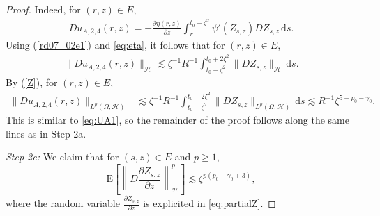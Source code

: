 \documentclass[12pt,a4paper]{article}
\newcommand{\E}{\mathrm{E}}
\renewcommand{\d}{\mathrm{d}}
\newcommand {\deltah}{{\zeta}}
\newcommand{\<}{\langle}
\renewcommand{\>}{\rangle}
\begin{document}
\begin{proof}
 Indeed, for $(r,z)\in E$,
           \begin{align*}
           Du_{A,2,4}(r,z) =- \frac{\partial \eta(r,z)}{\partial z} \int_r^{t_0+\deltah^2} \psi'(Z_{s,z})DZ_{s,z}\, \d s. 
           \end{align*}
Using (\ref{rd07_02e1}) and \eqref{eq:eta},  it follows that for $(r,z)\in E$, 
           \begin{align*}
           \|Du_{A,2,4}(r,z)\|_{\mathcal{H}} \lesssim \deltah^{-1} R^{-1} \int_{t_0-\deltah^2}^{t_0+2\deltah^2}\|DZ_{s,z}\|_{\mathcal{H}}\, \d s.
           \end{align*}
           By (\ref{Z}), for $(r,z)\in E$,
           \begin{align*}
           \|Du_{A,2,4}(r,z)\|_{L^p(\Omega, \mathcal{H})}& \lesssim \deltah^{-1} R^{-1} \int_{t_0-\deltah^2}^{t_0+2\deltah^2}\|DZ_{s,z}\|_{L^p(\Omega, \mathcal{H})}\, \d s
           \lesssim  R^{-1}\deltah^{5+p_0-\gamma_0}.
           \end{align*}
This is similar to \eqref{eq:UA1}, so the remainder of the proof follows along the same lines 
           as in Step 2a.
 
   \medskip
 \noindent
 {\it Step 2e:} We claim that for $(s,z)\in E$ and $p\geq1$,  
            \begin{equation} \label{partialZ}
             \E\left[\left\|D\frac{\partial Z_{s,z}}{\partial z}\right\|_{\mathcal{H}}^p \right] \lesssim \deltah^{p(p_0-\gamma_0+3)},
           \end{equation}
           where  the random variable $\frac{\partial Z_{s, z}}{\partial z}$ is explicited in \eqref{eq:partialZ}.
           

\end{proof}
\end{document}
